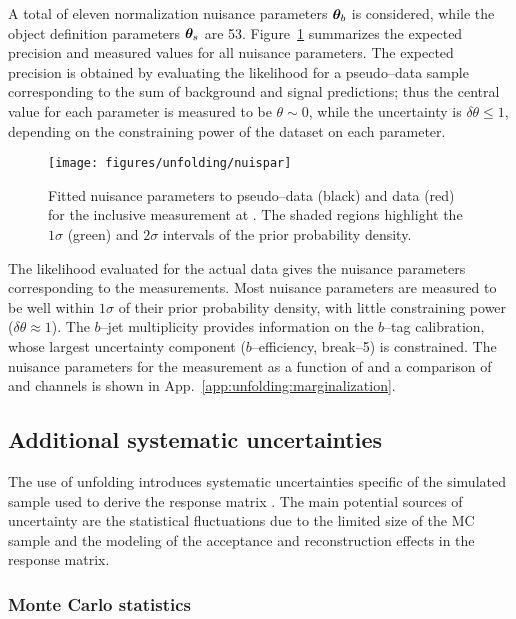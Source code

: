 A total of eleven normalization nuisance parameters $\boldsymbol{\theta}_b$ is
considered, while the object definition parameters $\boldsymbol{\theta}_s$ are 53. 
Figure~\ref{fig:nuispar} summarizes the expected precision and measured
values for all nuisance parameters. The expected precision is obtained
by evaluating the likelihood for a pseudo--data sample corresponding
to the sum of background and signal predictions; thus the central
value for each parameter is measured to be $\theta\sim0$, while the
uncertainty is $\delta\theta\leq1$, depending on the constraining power of
the dataset on each parameter.
\begin{figure}[!htb]\centering
  \texttt{[image: figures/unfolding/nuispar]}
  \caption{Fitted nuisance parameters to pseudo--data (black) and data
    (red) for the inclusive \ac{} measurement at \eighttev{}. The
    shaded regions highlight the $1\sigma$ (green) and $2\sigma$
    intervals of the prior probability density.}
  \label{fig:nuispar}
\end{figure}
The likelihood evaluated for the actual data gives the nuisance
parameters corresponding to the measurements. 
Most nuisance parameters are measured to be well within $1\sigma$ of
their prior probability density, with little constraining power
($\delta\theta\approx1$). The $b$--jet multiplicity provides
information on the $b$--tag calibration, whose largest uncertainty
component ($b$--efficiency, break--5) is constrained. The nuisance
parameters for the measurement as a function of \mtt{} and a
comparison of \ejets{} and \mujets{} channels is shown in
App.~\ref{app:unfolding:marginalization}. 

\subsection{Additional systematic uncertainties}

The use of unfolding introduces systematic uncertainties
specific of the \ttbar{} simulated sample used to derive the response
matrix \TrasfMatrix{}.
The main potential sources of uncertainty are the statistical fluctuations due
to the limited size of the MC sample and the modeling of the acceptance
and reconstruction effects in the response matrix.

\subsubsection{Monte Carlo statistics}
\label{sec:mcstat}

